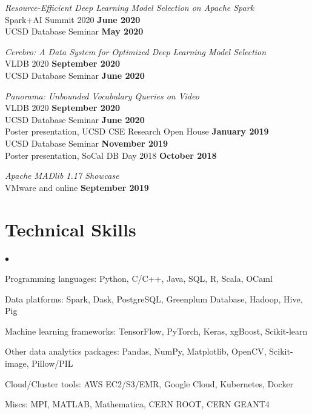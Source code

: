 \documentclass[margin,line]{res}
\newenvironment{list2}{
 \begin{list}{$\bullet$}{%
   \setlength{\itemsep}{0in}
   \setlength{\parsep}{0in} \setlength{\parskip}{0in}
   \setlength{\topsep}{0in} \setlength{\partopsep}{0in} 
   \setlength{\leftmargin}{0.2in}}}{\end{list}}
\begin{document}
\begin{resume}
\vspace{-3mm}
\textit{Resource-Efficient Deep Learning Model Selection on Apache Spark}\\
Spark+AI Summit 2020 \hfill {\bf June 2020}\\
UCSD Database Seminar \hfill {\bf May 2020}

\vspace{-3mm}
\textit{Cerebro: A Data System for Optimized Deep Learning Model Selection}\\
VLDB 2020 \hfill {\bf September 2020}\\
UCSD Database Seminar \hfill {\bf June 2020}

\vspace{-3mm}
\textit{Panorama: Unbounded Vocabulary Queries on Video}\\
VLDB 2020 \hfill {\bf September 2020}\\
UCSD Database Seminar \hfill {\bf June 2020}\\
Poster presentation, UCSD CSE Research Open House \hfill {\bf January 2019}\\
UCSD Database Seminar \hfill {\bf November 2019}\\
Poster presentation, SoCal DB Day 2018 \hfill {\bf October 2018}

\vspace{-3mm}
\textit{Apache MADlib 1.17 Showcase}\\
VMware and online \hfill {\bf September 2019}\\




\section{\sc Technical Skills} 
\begin{list2}
\item Programming languages: Python, C/C++, Java, SQL, R, Scala, OCaml
\item Data platforms: Spark, Dask, PostgreSQL, Greenplum Database, Hadoop, Hive, Pig
\item Machine learning frameworks: TensorFlow, PyTorch, Keras, xgBoost, Scikit-learn
\item Other data analytics packages: Pandas, NumPy, Matplotlib, OpenCV, Scikit-image, Pillow/PIL
\item Cloud/Cluster tools: AWS EC2/S3/EMR, Google Cloud, Kubernetes, Docker
\item Miscs: MPI, MATLAB, Mathematica, CERN ROOT, CERN GEANT4\\ 
\end{list2}



\end{resume}
\end{document}
